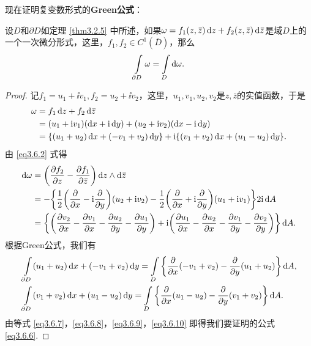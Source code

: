 现在证明复变数形式的\textbf{Green公式}：
\begin{theorem}\label{thm3.6.1}
  设$D$和$\partial D$如定理 \ref{thm3.2.5} 中所述，如果$\omega=f_1(z,\bar z)\dz+f_2(z,\bar z)\dzz$是域$D$上的一个一次微分形式，这里，$f_1,f_2\in C^1(\bar D)$，那么
\begin{equation}\label{eq3.6.6}
  \int\limits_{\partial D}\omega = \int\limits_D\dif \omega.
\end{equation}
\end{theorem}
\begin{proof}
  记$f_1=u_1+\ii v_1,f_2=u_2+\ii v_2$，这里，$u_1,v_1,u_2,v_2$是$z,\bar z$的实值函数，于是
  \begin{equation}\label{eq3.6.7}
    \begin{aligned}
      \omega & = f_1\dz + f_2\dzz\\
      & = (u_1+\ii v_1)(\dx+\ii\dy)+(u_2+\ii v_2)(\dx-\ii\dy)\\
      & = \{(u_1+u_2)\dx+(-v_1+v_2)\dy\}+\ii\{(v_1+v_2)\dx+(u_1-u_2)\dy\}.
    \end{aligned}
  \end{equation}
  由 \eqref{eq3.6.2} 式得
  \begin{equation}\label{eq3.6.8}
    \begin{aligned}
      \dif \omega & = \bigg(\pp{f_2}z-\pp{f_1}{\bar z}\bigg)\dz\wedge\dzz\\
      & = -\bigg\{\frac12\bigg(\pp{}x-\ii\pp{}y\bigg)(u_2+\ii v_2)
      -\frac12\bigg(\pp{}x+\ii\pp{}y\bigg)(u_1+\ii v_1)\bigg\}2\ii\dif A\\
      & = \bigg\{\bigg(\pp{v_2}x-\pp{v_1}x-\pp{u_2}y-\pp{u_1}y\bigg)
      + \ii\bigg(\pp{u_1}x-\pp{u_2}x-\pp{v_1}y-\pp{v_2}y\bigg)\bigg\}\dif A.
    \end{aligned}
  \end{equation}
  根据Green公式，我们有
  \begin{align}
    & \int\limits_{\partial D}(u_1+u_2)\dx+(-v_1+v_2)\dy
    = \int\limits_D\bigg\{\pp{}x(-v_1+v_2)-\pp{}y(u_1+u_2)\bigg\}\dif A,\label{eq3.6.9}\\
    & \int\limits_{\partial D}(v_1+v_2)\dx+(u_1-u_2)\dy
    = \int\limits_D\bigg\{\pp{}x(u_1-u_2)-\pp{}y(v_1+v_2)\bigg\}\dif A.\label{eq3.6.10}
  \end{align}
  由等式 \eqref{eq3.6.7}，\eqref{eq3.6.8}，\eqref{eq3.6.9}，\eqref{eq3.6.10} 即得我们要证明的公式 \eqref{eq3.6.6}.
\end{proof}

